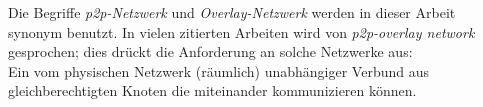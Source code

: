 Die Begriffe \emph{p2p-Netzwerk} und \emph{Overlay-Netzwerk} werden in dieser Arbeit synonym benutzt. In vielen zitierten Arbeiten wird von \emph{p2p-overlay network} gesprochen; dies drückt die Anforderung an solche Netzwerke aus:\\
Ein vom physischen Netzwerk (räumlich) unabhängiger Verbund aus gleichberechtigten Knoten die miteinander kommunizieren können.






